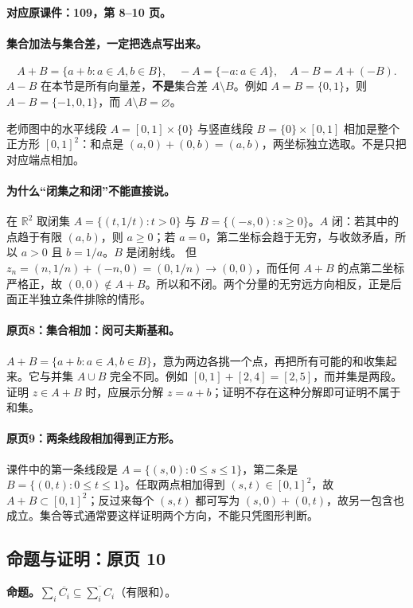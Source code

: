 \documentclass[11pt,a4paper]{article}
\newcommand{\R}{\mathbb{R}}\newcommand{\N}{\mathbb{N}}
\theoremstyle{definition}\newtheorem{definition}{定义}\newtheorem{example}{例}
\begin{document}
\textbf{对应原课件：109，第 8--10 页。}


\paragraph{集合加法与集合差，一定把选点写出来。}
\[A+B=\{a+b:a\in A,b\in B\},\quad -A=\{-a:a\in A\},\quad A-B=A+(-B).
\]
$A-B$ 在本节是所有向量差，\textbf{不是}集合差 $A\setminus B$。例如 $A=B=\{0,1\}$，则 $A-B=\{-1,0,1\}$，而 $A\setminus B=\varnothing$。

老师图中的水平线段 $A=[0,1]\times\{0\}$ 与竖直线段 $B=\{0\}\times[0,1]$ 相加是整个正方形 $[0,1]^2$：和点是 $(a,0)+(0,b)=(a,b)$，两坐标独立选取。不是只把对应端点相加。
\paragraph{为什么“闭集之和闭”不能直接说。}
在 $\R^2$ 取闭集 $A=\{(t,1/t):t>0\}$ 与 $B=\{(-s,0):s\ge0\}$。$A$ 闭：若其中的点趋于有限 $(a,b)$，则 $a\ge0$；若 $a=0$，第二坐标会趋于无穷，与收敛矛盾，所以 $a>0$ 且 $b=1/a$。$B$ 是闭射线。
但 $z_n=(n,1/n)+(-n,0)=(0,1/n)\to(0,0)$，而任何 $A+B$ 的点第二坐标严格正，故 $(0,0)\notin A+B$。所以和不闭。两个分量的无穷远方向相反，正是后面正半独立条件排除的情形。


\paragraph{原页8：集合相加：闵可夫斯基和。}$A+B=\{a+b:a\in A,b\in B\}$，意为两边各挑一个点，再把所有可能的和收集起来。它与并集 $A\cup B$ 完全不同。例如 $[0,1]+[2,4]=[2,5]$，而并集是两段。证明 $z\in A+B$ 时，应展示分解 $z=a+b$；证明不存在这种分解即可证明不属于和集。



\paragraph{原页9：两条线段相加得到正方形。}课件中的第一条线段是 $A=\{(s,0):0\le s\le1\}$，第二条是 $B=\{(0,t):0\le t\le1\}$。任取两点相加得到 $(s,t)\in[0,1]^2$，故 $A+B\subset[0,1]^2$；反过来每个 $(s,t)$ 都可写为 $(s,0)+(0,t)$，故另一包含也成立。集合等式通常要这样证明两个方向，不能只凭图形判断。



\subsection{命题与证明：原页 10}

\textbf{命题。}$\sum_i\overline{C_i}\subseteq\overline{\sum_i C_i}$（有限和）。
\end{document}
